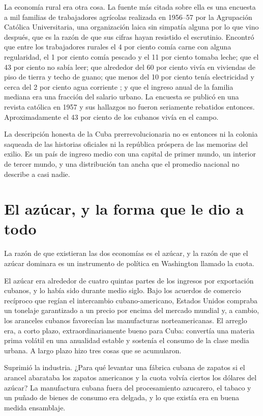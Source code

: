 La economía rural era otra cosa. La fuente más citada sobre ella es una encuesta
a mil familias de trabajadores agrícolas realizada en 1956--57 por la Agrupación
Católica Universitaria, una organización laica sin simpatía alguna por lo que
vino después, que es la razón de que sus cifras hayan resistido el escrutinio.
Encontró que entre los trabajadores rurales el 4 por ciento comía carne con
alguna regularidad, el 1 por ciento comía pescado y el 11 por ciento tomaba
leche; que el 43 por ciento no sabía leer; que alrededor del 60 por ciento vivía
en viviendas de piso de tierra y techo de guano; que menos del 10 por ciento
tenía electricidad y cerca del 2 por ciento agua corriente
\citep{perezstable2012}; y que el ingreso anual de la familia mediana era una
fracción del salario urbano. La encuesta se publicó en una revista católica en
1957 y sus hallazgos no fueron seriamente rebatidos entonces. Aproximadamente el
43 por ciento de los cubanos vivía en el campo.

La descripción honesta de la Cuba prerrevolucionaria no es entonces ni la colonia
saqueada de las historias oficiales ni la república próspera de las memorias del
exilio. Es un país de ingreso medio con una capital de primer mundo, un interior
de tercer mundo, y una distribución tan ancha que el promedio nacional no
describe a casi nadie.

\section{El azúcar, y la forma que le dio a todo}

La razón de que existieran las dos economías es el azúcar, y la razón de que el
azúcar dominara es un instrumento de política en Washington llamado la cuota.

El azúcar era alrededor de cuatro quintas partes de los ingresos por
exportación cubanos, y lo había sido durante medio siglo.\unv{} Bajo los
acuerdos de comercio recíproco que regían el intercambio cubano-americano,
Estados Unidos compraba un tonelaje garantizado a un precio por encima del
mercado mundial y, a cambio, los aranceles cubanos favorecían las manufacturas
norteamericanas. El arreglo era, a corto plazo, extraordinariamente bueno para
Cuba: convertía una materia prima volátil en una anualidad estable y sostenía el
consumo de la clase media urbana. A largo plazo hizo tres cosas que se
acumularon.

Suprimió la industria. ¿Para qué levantar una fábrica cubana de zapatos si el
arancel abarataba los zapatos americanos y la cuota volvía ciertos los dólares
del azúcar? La manufactura cubana fuera del procesamiento azucarero, el tabaco y
un puñado de bienes de consumo era delgada, y lo que existía era en buena medida
ensamblaje.


